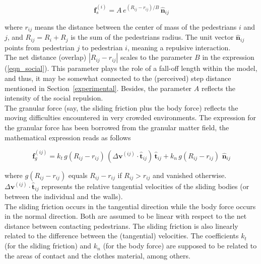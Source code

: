 \documentclass[preprint,12pt]{elsarticle}
\begin{document}
\begin{equation}
 \mathbf{f}_s^{(i)}=A\,e^{(R_{ij}-r_{ij})/B}\,\hat{\mathbf{n}}_{ij}
 \label{eqn_social}
\end{equation}

\noindent where $r_{ij}$ means the distance between the center of mass of the 
pedestrians $i$ and $j$, and $R_{ij}=R_i+R_j$ is the sum of the pedestrians 
radius. The unit vector $\hat{\mathbf{n}}_{ij}$ points from pedestrian $j$ to 
pedestrian $i$, meaning a repulsive interaction.\\ 

The net distance (overlap) $|R_{ij}-r_{ij}|$ scales to the parameter $B$ in the 
expression (\ref{eqn_social}). This parameter plays the role of a fall-off 
length within the model, and thus, it may be somewhat connected to the 
(perceived) step distance mentioned in Section~\ref{experimental}. 
Besides, the parameter $A$ reflects the intensity of the social repulsion. \\    

The granular force (say, the sliding friction plus the body force) reflects 
the moving difficulties encountered in very crowded environments. The 
expression for the granular force has been borrowed from the granular 
matter field, the mathematical expression reads as follows

\begin{equation}
 \mathbf{f}_g^{(ij)}=k_t\,g(R_{ij}-r_{ij})\,
(\Delta\mathbf{v}^{(ij)}\cdot\hat{\mathbf{t}}_{ij})\,\hat{\mathbf{t}}_{ij}+
k_n\,g(R_{ij}-r_{ij})\,
\,\hat{\mathbf{n}}_{ij}\label{eqn_friction}
\end{equation}

\noindent where $g(R_{ij}-r_{ij})$ equals $R_{ij}-r_{ij}$ if $R_{ij}>r_{ij}$ and 
vanished otherwise. $\Delta\mathbf{v}^{(ij)}\cdot\hat{\mathbf{t}}_{ij}$ 
represents the relative tangential velocities of the sliding 
bodies (or between the individual and the walls).    \\

The sliding friction occurs in the tangential direction while the body force 
occurs in the normal direction. Both are assumed to be linear with respect to 
the net distance between contacting pedestrians. The sliding friction is also 
linearly related to the difference between the (tangential) velocities. The 
coefficients $k_t$ (for the sliding friction) and $k_n$ (for the 
body force) are supposed to be related to the areas of contact and the clothes 
material, among others. \\
\end{document}

